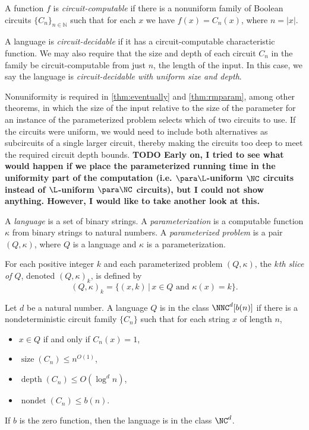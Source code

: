 \documentclass{article}
\newcommand{\todo}[1]{\textbf{TODO #1}}
\DeclareMathOperator{\depth}{depth}
\DeclareMathOperator{\nondet}{nondet}
\DeclareMathOperator{\size}{size}
\begin{document}
\begin{definition}
  A function $f$ is \emph{circuit-computable} if there is a nonuniform family of Boolean circuits $\{C_n\}_{n \in \mathbb{N}}$ such that for each $x$ we have $f(x) = C_n(x)$, where $n = |x|$.

  A language is \emph{circuit-decidable} if it has a circuit-computable characteristic function.
  We may also require that the size and depth of each circuit $C_n$ in the family be circuit-computable from just $n$, the length of the input.
  In this case, we say the language is \emph{circuit-decidable with uniform size and depth}.
\end{definition}

Nonuniformity is required in \autoref{thm:eventually} and \autoref{thm:rmparam}, among other theorems, in which the size of the input relative to the size of the parameter for an instance of the parameterized problem selects which of two circuits to use.
If the circuits were uniform, we would need to include both alternatives as subcircuits of a single larger circuit, thereby making the circuits too deep to meet the required circuit depth bounds.
\todo{
  Early on, I tried to see what would happen if we place the parameterized running time in the uniformity part of the computation (i.e. $\para \L$-uniform $\NC$ circuits instead of $\L$-uniform $\para \NC$ circuits), but I could not show anything.
  However, I would like to take another look at this.
}

\begin{definition}
  A \emph{language} is a set of binary strings.
  A \emph{parameterization} is a computable function $\kappa$ from binary strings to natural numbers.
  A \emph{parameterized problem} is a pair $(Q, \kappa)$, where $Q$ is a language and $\kappa$ is a parameterization.
\end{definition}

\begin{definition}
  For each positive integer $k$ and each parameterized problem $(Q, \kappa)$, the \emph{$k$th slice of $Q$}, denoted $(Q, \kappa)_k$, is defined by
  \[
  (Q, \kappa)_k = \{(x, k) \, | \, x \in Q \text{ and } \kappa(x) = k\}.
  \]
\end{definition}

\begin{definition}
  Let $d$ be a natural number.
  A language $Q$ is in the class $\NNC^d[b(n)]$ if there is a nondeterministic circuit family $\{C_n\}$ such that for each string $x$ of length $n$,
  \begin{itemize}
  \item $x \in Q$ if and only if $C_n(x) = 1$,
  \item $\size(C_n) \leq n^{O(1)}$,
  \item $\depth(C_n) \leq O(\log^d n)$,
  \item $\nondet(C_n) \leq b(n)$.
  \end{itemize}
  If $b$ is the zero function, then the language is in the class $\NC^d$.
\end{definition}
\end{document}
